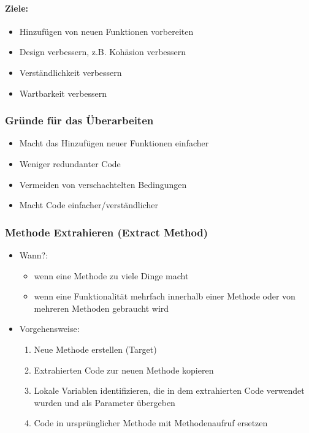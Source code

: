 \documentclass[
    ngerman,
    color=3b,
    summary,
    boxarc,
    main,
]{rubos-tuda-template}
\begin{document}
\paragraph{Ziele:}\begin{itemize}
    \item Hinzufügen von neuen Funktionen vorbereiten
    \item Design verbessern, z.B. Kohäsion verbessern
    \item Verständlichkeit verbessern
    \item Wartbarkeit verbessern
\end{itemize}
\subsubsection{Gründe für das Überarbeiten}
\begin{itemize}
    \item Macht das Hinzufügen neuer Funktionen einfacher
    \item Weniger redundanter Code
    \item Vermeiden von verschachtelten Bedingungen
    \item Macht Code einfacher/verständlicher
\end{itemize}
\subsubsection{Methode Extrahieren (Extract Method)}
\begin{itemize}
    \item Wann?: \begin{itemize}
              \item wenn eine Methode zu viele Dinge macht
              \item wenn eine Funktionalität mehrfach innerhalb einer Methode oder von mehreren Methoden gebraucht wird
          \end{itemize}
    \item Vorgehensweise:\begin{enumerate}
              \item Neue Methode erstellen (Target)
              \item Extrahierten Code zur neuen Methode kopieren
              \item Lokale Variablen identifizieren, die in dem extrahierten Code verwendet wurden und als Parameter übergeben
              \item Code in ursprünglicher Methode mit Methodenaufruf ersetzen
          \end{enumerate}
\end{itemize}
\clearpage
\end{document}
